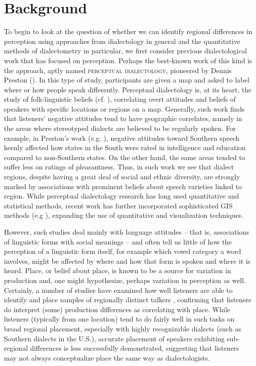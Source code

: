 \documentclass[output=paper]{LSP/langsci}
\begin{document}
\section{Background}
To begin to look at the question of whether we can identify regional differences in perception using approaches from dialectology in general and the quantitative methods of dialectometry in particular, we first consider previous dialectological work that has focused on perception. Perhaps the best-known work of this kind is the approach, aptly named \textsc{perceptual dialectology}, pioneered by Dennis Preston (\citeyear{preston_perceptual_1989,preston_folk_1993}). In this type of study, participants are given a map and asked to label where or how people speak differently. Perceptual dialectology is, at its heart, the study of folk-linguistic beliefs (cf. \citealt{niedzielski_folk_1999}), correlating overt attitudes and beliefs of speakers with specific locations or regions on a map. Generally, such work finds that listeners’ negative attitudes tend to have geographic correlates, namely in the areas where stereotyped dialects are believed to be regularly spoken. For example, in Preston’s work (e.g. \citeyear{preston_perceptual_1989}), negative attitudes toward Southern speech keenly affected how states in the South were rated in intelligence and education compared to non-Southern states. On the other hand, the same areas tended to suffer less on ratings of pleasantness. Thus, in such work we see that dialect regions, despite having a great deal of social and ethnic diversity, are strongly marked by associations with prominent beliefs about speech varieties linked to region. While perceptual dialectology research has long used quantitative and statistical methods, recent work has further incorporated sophisticated GIS methods (e.g \citealt{evans_seattle_2013}), expanding the use of quantitative and visualization techniques.

However, such studies deal mainly with language attitudes – that is, associations of linguistic forms with social meanings – and often tell us little of how the perception of a linguistic form itself, for example which vowel category a word involves, might be affected by where and how that form is spoken and where it is heard. Place, or belief about place, is known to be a source for variation in production and, one might hypothesize, perhaps variation in perception as well. Certainly, a number of studies have examined how well listeners are able to identify and place samples of regionally distinct talkers \citep{clopper_acoustic_2004,clopper_free_2007,preston_where_1996,van_bezooijen_identification_1999}, confirming that listeners do interpret (some) production differences as correlating with place. While listeners (typically from one location) tend to do fairly well in such tasks on broad regional placement, especially with highly recognizable dialects (such as Southern dialects in the U.S.), accurate placement of speakers exhibiting sub-regional differences is less successfully demonstrated, suggesting that listeners may not always conceptualize place the same way as dialectologists.  
\end{document}
